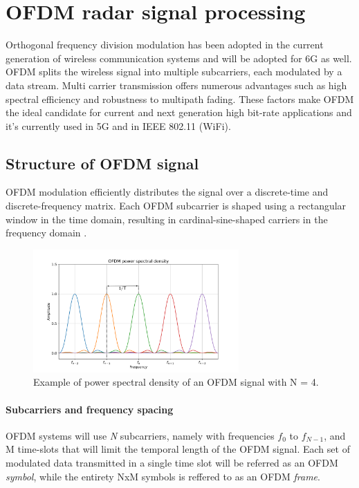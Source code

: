 \chapter{OFDM radar signal processing}
\label{chap_OFDM}

Orthogonal frequency division modulation has been adopted in the current generation of wireless communication systems and will be adopted for 6G as well.
OFDM splits the wireless signal into multiple subcarriers, each modulated by a data stream. Multi carrier transmission offers numerous advantages such as high spectral efficiency and robustness to multipath fading. These factors make OFDM the ideal candidate for current and next generation high bit-rate applications and it's currently used in 5G and in IEEE 802.11 (WiFi).



\section{Structure of OFDM signal}

OFDM modulation efficiently distributes the signal over a discrete-time and discrete-frequency matrix. Each OFDM subcarrier is shaped using a rectangular window in the time domain, resulting in cardinal-sine-shaped carriers in the frequency domain \cite{Schaich_Wild_2014}.

\begin{figure}[H]
    \centering
    \includegraphics[width=0.7\textwidth]{images/theoretical/ofdm/ofdm_psd_mod.png}
    \caption{Example of power spectral density of an OFDM signal with N = 4.}
    \label{fig:quadtree}
\end{figure}

\subsubsection{Subcarriers and frequency spacing}
OFDM systems will use \textit{N} subcarriers, namely with frequencies $f_0$ to $f_{N-1}$, and M time-slots that will limit the temporal length of the OFDM signal.
Each set of modulated data transmitted in a single time slot will be referred as an OFDM \textit{symbol}, while the entirety NxM symbols is reffered to as an OFDM \textit{frame}.

